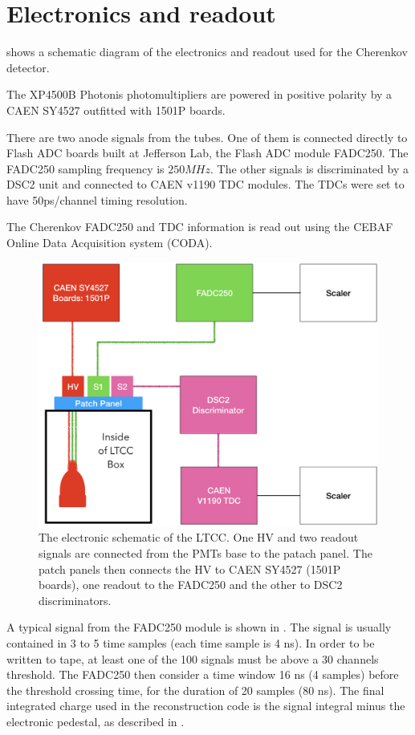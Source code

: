 \section{Electronics and readout}

 shows a schematic diagram of the electronics and readout used for the Cherenkov detector.

The XP4500B Photonis photomultipliers are powered in positive polarity by a CAEN SY4527 outfitted with 1501P boards.

There are two anode signals from the tubes. One of them is connected directly to Flash ADC
boards built at Jefferson Lab, the Flash ADC module FADC250. The FADC250 sampling frequency is $250 MHz$.
The other signals is discriminated by a DSC2 unit and connected to CAEN v1190 TDC modules.
The TDCs were set to have 50ps/channel timing resolution.

The Cherenkov FADC250 and TDC information is read out using the CEBAF Online Data Acquisition system (CODA).

\begin{figure}
	\centering
	\includegraphics[width=0.95\columnwidth,keepaspectratio]{img/electronicScheme.png}
	\caption{The electronic schematic of the LTCC. One HV and two readout signals are connected from the PMTs base to the patach panel.
				The patch panels then connects the HV to CAEN SY4527 (1501P boards), one readout to the FADC250 and the other to DSC2 discriminators.}
	\label{fig:electronicScheme}
\end{figure}


A typical signal from the FADC250 module is shown in . The signal is usually contained in 3 to 5 time samples (each time sample is 4 ns).
In order to be written to tape, at least one of the 100 signals must be above a 30 channels threshold. The FADC250 then consider a time window 16 ns (4 samples)
before the threshold crossing time, for the duration of 20 samples (80 ns). The final integrated charge used in the reconstruction code is the signal integral
minus the electronic pedestal, as described in .



